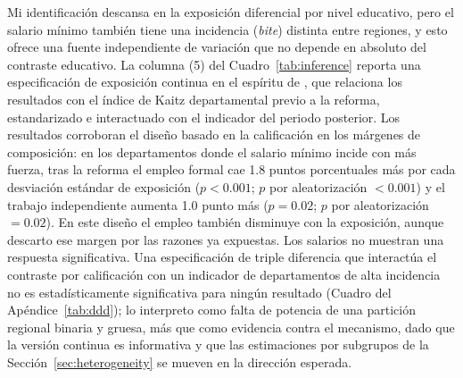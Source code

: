 Mi identificación descansa en la exposición diferencial por nivel educativo, pero el salario mínimo también tiene una incidencia (\emph{bite}) distinta entre regiones, y esto ofrece una fuente independiente de variación que no depende en absoluto del contraste educativo. La columna (5) del Cuadro~\ref{tab:inference} reporta una especificación de exposición continua en el espíritu de \citet{card_1992}, que relaciona los resultados con el índice de Kaitz departamental previo a la reforma, estandarizado e interactuado con el indicador del periodo posterior. Los resultados corroboran el diseño basado en la calificación en los márgenes de composición: en los departamentos donde el salario mínimo incide con más fuerza, tras la reforma el empleo formal cae 1.8 puntos porcentuales más por cada desviación estándar de exposición ($p<0.001$; $p$ por aleatorización $<0.001$) y el trabajo independiente aumenta 1.0 punto más ($p=0.02$; $p$ por aleatorización $=0.02$). En este diseño el empleo también disminuye con la exposición, aunque descarto ese margen por las razones ya expuestas. Los salarios no muestran una respuesta significativa. Una especificación de triple diferencia que interactúa el contraste por calificación con un indicador de departamentos de alta incidencia no es estadísticamente significativa para ningún resultado (Cuadro del Apéndice~\ref{tab:ddd}); lo interpreto como falta de potencia de una partición regional binaria y gruesa, más que como evidencia contra el mecanismo, dado que la versión continua es informativa y que las estimaciones por subgrupos de la Sección~\ref{sec:heterogeneity} se mueven en la dirección esperada.

